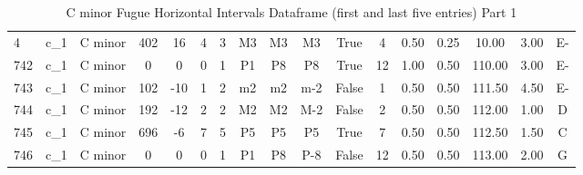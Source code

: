 \begin{table}[H]
\begin{tabular}{|lcccccccccccccccc|}
   4   & c\_1 & C minor & 402   & 16                                & 4         & 3                                & M3                          & M3   & M3                            & True      & 4                               & 0.50                        & 0.25                        & 10.00  & 3.00 & E-                       \\
   742 & c\_1 & C minor & 0     & 0                                 & 0         & 1                                & P1                          & P8   & P8                            & True      & 12                              & 1.00                        & 0.50                        & 110.00 & 3.00 & E-                       \\
   743 & c\_1 & C minor & 102   & -10                               & 1         & 2                                & m2                          & m2   & m-2                           & False     & 1                               & 0.50                        & 0.50                        & 111.50 & 4.50 & E-                       \\
   744 & c\_1 & C minor & 192   & -12                               & 2         & 2                                & M2                          & M2   & M-2                           & False     & 2                               & 0.50                        & 0.50                        & 112.00 & 1.00 & D                        \\
   745 & c\_1 & C minor & 696   & -6                                & 7         & 5                                & P5                          & P5   & P5                            & True      & 7                               & 0.50                        & 0.50                        & 112.50 & 1.50 & C                        \\
   746 & c\_1 & C minor & 0     & 0                                 & 0         & 1                                & P1                          & P8   & P-8                           & False     & 12                              & 0.50                        & 0.50                        & 113.00 & 2.00 & G                        \\
   \hline
\end{tabular}
\caption{C minor Fugue Horizontal Intervals Dataframe (first and last five entries) Part 1}
\end{table}
 
